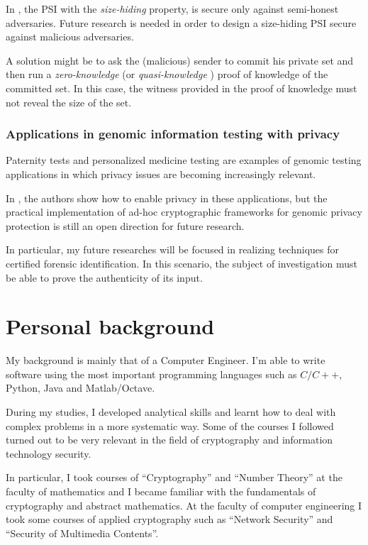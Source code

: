 \documentclass[dvips,12pt]{article}
\begin{document}
In \cite{size-psi}, the PSI with the \emph{size-hiding} property, is secure only against semi-honest adversaries. Future research is needed in order to design a size-hiding PSI secure against malicious adversaries.
 
A solution might be to ask the (malicious) sender to commit his private set and then run a \emph{zero-knowledge} (or \emph{quasi-knowledge} \cite{DBcommitment}) proof of knowledge of the committed set. 
In this case, the witness provided in the proof of knowledge must not reveal the size of the set.  

\subsubsection{Applications in genomic information testing with privacy}
Paternity tests and personalized medicine testing are examples of genomic testing applications in which privacy issues are becoming increasingly relevant.  

In \cite{genome}, the authors show how to enable privacy in these applications, but the practical implementation of ad-hoc cryptographic frameworks for genomic privacy protection is still an open direction for future research. 

In particular, my future researches will be focused in realizing techniques for certified forensic identification. In this scenario, the subject of investigation must be able to prove the authenticity of its input.

\section{Personal background}
My background is mainly that of a Computer Engineer.
I'm able to write software using the most important programming languages such as $C / C++$, Python, Java and Matlab/Octave.

During my studies, I developed analytical skills and learnt how to deal with complex problems in a more systematic way. Some of the courses I followed turned out to be very relevant in the field of cryptography and information technology security.
 
In particular, I took courses of ``Cryptography'' and ``Number Theory'' at the faculty of mathematics and I became familiar with the fundamentals of cryptography and abstract mathematics.
At the faculty of computer engineering I took some courses of applied cryptography such as ``Network Security'' and ``Security of Multimedia Contents''.
\end{document}

